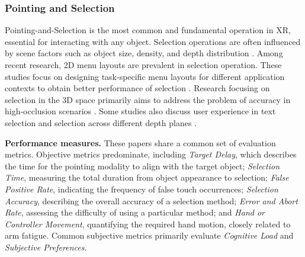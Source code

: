 \documentclass[review]{fcs}
\newcommand{\revise}[2]{\textcolor[rgb]{0,0,0}{#2}}
\begin{document}
\subsubsection{Pointing and Selection}
Pointing-and-Selection is the most common and fundamental operation in XR, essential for interacting with any object. Selection operations are often influenced by scene factors such as object size, density, and depth distribution \cite{marquardt2024selection}. \revise{In recent researches, 2D menu layouts are prevalent in selection operation.}{Among recent research, 2D menu layouts are prevalent in selection operation.} \revise{These researches focuse on designing task-specific menu layouts for different application contexts to achieve better selection}{These studies focus on designing task-specific menu layouts for different application contexts to obtain better performance of selection} \cite{DBLP:conf/ismar/ChenGFCL23, DBLP:conf/ismar/LeeHM22, DBLP:conf/vr/OrloskyLSSM24, kim2022lattice, DBLP:conf/vr/0001LC00S22, DBLP:conf/vr/QuereMJWW24, 10.1145/3544548.3581423, DBLP:conf/vr/LaiSL24}. \revise{Researches focusing on selection in 3D space primarily addresses high-occlusion scenarios}{Research focusing on selection in the 3D space primarily aims to address the problem of accuracy in high-occlusion scenarios}  \cite{DBLP:conf/chi/SidenmarkCNLPG23, DBLP:conf/chi/WeiSYW0YL23, DBLP:conf/uist/0001QTFLS22}. Some studies also discuss user experience in text selection \cite{DBLP:conf/ismar/LeeHM22, DBLP:conf/ismar/MengXL22} and selection across different depth planes \cite{DBLP:conf/chi/ZhangCSS24, DBLP:conf/uist/0001QTFLS22, DBLP:journals/tvcg/WangZ022}.


\textbf{Performance measures.} These papers share a common set of evaluation metrics. Objective metrics predominate, including \textit{Target Delay}, which describes the time for the pointing modality to align with the target object; \textit{Selection Time}, measuring the total duration from object appearance to selection; \textit{False Positive Rate}, indicating the frequency of false touch occurrences; \textit{Selection Accuracy}, describing the overall accuracy of a selection method; \textit{Error and Abort Rate}, assessing the difficulty of using a particular method; and \textit{Hand or Controller Movement}, quantifying the required hand motion, closely related to arm fatigue. Common subjective metrics primarily evaluate \textit{Cognitive Load} and \textit{Subjective Preferences}.
\end{document}
